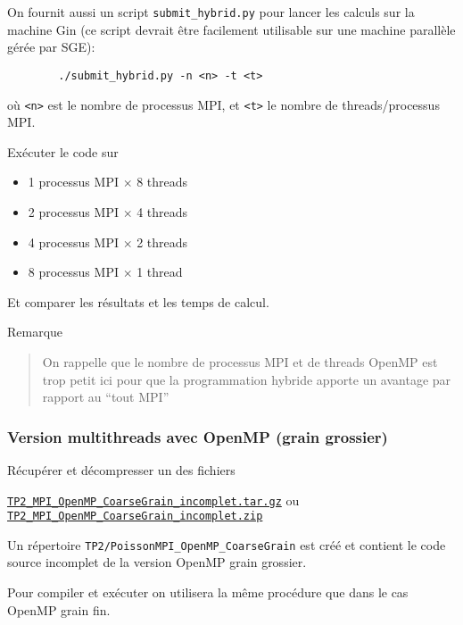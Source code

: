 \documentclass{beamer}
\begin{document}
\begin{frame}[fragile]
	On fournit aussi un script \texttt{submit\_hybrid.py} pour lancer les calculs sur la machine Gin (ce script devrait être facilement utilisable sur une machine parallèle gérée par SGE):
	
	{\color{blue}\begin{verbatim}
		./submit_hybrid.py -n <n> -t <t>
		\end{verbatim}
	}
	
	où \texttt{<n>} est le nombre de processus MPI, et \texttt{<t>} le nombre de threads/processus MPI.

\vfill
    Exécuter le code sur 
    \begin{itemize}
    	\item 1 processus MPI $\times$ 8 threads
    	\item 2 processus MPI $\times$ 4 threads
    	\item 4 processus MPI $\times$ 2 threads
    	\item 8 processus MPI $\times$ 1 thread
    \end{itemize}
 	
 	Et comparer les résultats et les temps de calcul.
 	
\end{frame}

\begin{frame}
 	Remarque
 	\begin{quote}
 		On rappelle que le nombre de processus MPI et de threads OpenMP est trop petit ici pour que la programmation hybride apporte un avantage par rapport au ``tout MPI''
 	\end{quote}
\end{frame}

\begin{frame}[fragile]
	\frametitle{Version multithreads avec OpenMP (grain grossier)}
	
	Récupérer et décompresser un des fichiers \bigskip
	
	\href{https://perso.ensta-paris.fr/~tajchman/Seance5/TP2_MPI_OpenMP_FineGrain_incomplet.tar.gz}{\tt TP2\_MPI\_OpenMP\_CoarseGrain\_incomplet.tar.gz} ou \href{https://perso.ensta-paris.fr/~tajchman/Seance5/TP2_MPI_OpenMP_FineGrain_incomplet.zip}{\tt TP2\_MPI\_OpenMP\_CoarseGrain\_incomplet.zip}
	\bigskip
	
	Un répertoire {\tt TP2/PoissonMPI\_OpenMP\_CoarseGrain} est créé et contient le code source incomplet de la version OpenMP grain grossier.
	
	\vfill
	Pour compiler et exécuter on utilisera la même procédure que dans le cas OpenMP grain fin.
	
\end{frame}
\end{document}
